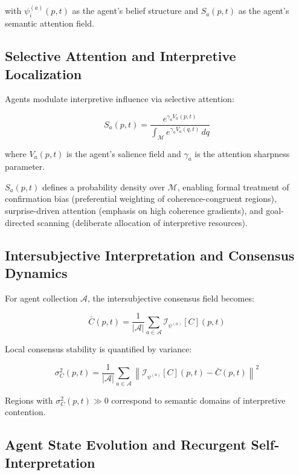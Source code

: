 with \(\psi_i^{(a)}(p, t)\) as the agent's belief structure and \(S_a(p, t)\) as the agent's semantic attention field.

\subsection{Selective Attention and Interpretive Localization}

Agents modulate interpretive influence via selective attention:

\begin{equation}
S_a(p, t) = \frac{e^{\gamma_a V_a(p, t)}}{\int_{\mathcal{M}} e^{\gamma_a V_a(q, t)}\, dq}
\end{equation}

where \(V_a(p, t)\) is the agent's salience field and \(\gamma_a\) is the attention sharpness parameter.

\(S_a(p, t)\) defines a probability density over \(\mathcal{M}\), enabling formal treatment of confirmation bias (preferential weighting of coherence-congruent regions), surprise-driven attention (emphasis on high coherence gradients), and goal-directed scanning (deliberate allocation of interpretive resources).

\subsection{Intersubjective Interpretation and Consensus Dynamics}

For agent collection \(\mathcal{A}\), the intersubjective consensus field becomes:

\begin{equation}
\bar{C}(p, t) = \frac{1}{|\mathcal{A}|} \sum_{a \in \mathcal{A}} \mathcal{I}_{\psi^{(a)}}[C](p, t)
\end{equation}

Local consensus stability is quantified by variance:

\begin{equation}
\sigma^2_C(p, t) = \frac{1}{|\mathcal{A}|} \sum_{a \in \mathcal{A}} \left\| \mathcal{I}_{\psi^{(a)}}[C](p, t) - \bar{C}(p, t) \right\|^2
\end{equation}

Regions with \(\sigma^2_C(p, t) \gg 0\) correspond to semantic domains of interpretive contention.

\subsection{Agent State Evolution and Recurgent Self-Interpretation}

